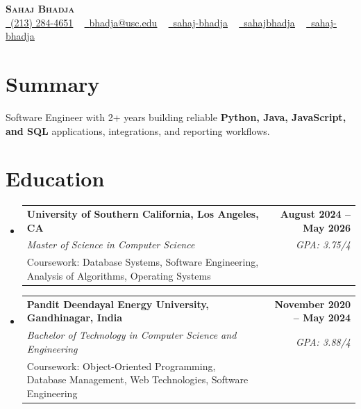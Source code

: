 \documentclass[letterpaper,10pt]{article}
\makeatletter
\newcommand{\sectionGap}{\vspace{-8pt}}
\newcommand{\resumeEduSubheading}[5]{\vspace{-1pt}\item\begin{tabular*}{1.0\textwidth}[t]{l@{\extracolsep{\fill}}r}\textbf{#1} & \textbf{\small #2} \\\textit{\small #3} & \textit{\small #4} \\\small #5 & \\\end{tabular*}\vspace{-4pt}}
\newcommand{\resumeSubHeadingListStart}{\begin{itemize}[leftmargin=0.0in, label={}]}
\newcommand{\resumeSubHeadingListEnd}{\end{itemize}}
\makeatother
\begin{document}
\begin{center}
{\Huge \scshape \textbf{Sahaj Bhadja}} \\ \vspace{1pt}
\small \href{tel:2132844651}{\faPhone\ \underline{(213) 284-4651}} ~ \href{mailto:bhadja@usc.edu}{\raisebox{-0.2\height}\faEnvelope\ \underline{bhadja@usc.edu}} ~
\href{https://www.linkedin.com/in/sahaj-bhadja/}{\raisebox{-0.2\height}\faLinkedin\ \underline{sahaj-bhadja}} ~ \href{https://github.com/SAHAJ-BHADJA}{\raisebox{-0.2\height}\faGithub\ \underline{sahajbhadja}} ~
\href{https://sahaj-bhadja.vercel.app/}{\raisebox{-0.2\height}\faGlobe\ \underline{sahaj-bhadja}}
\end{center}
\vspace{-16pt}
\section{Summary}
\begin{itemize}[leftmargin=0.15in, label={}]
\small{\item{Software Engineer with 2+ years building reliable \textbf{Python, Java, JavaScript, and SQL} applications, integrations, and reporting workflows.}}
\end{itemize}
\sectionGap
\section{Education}
\resumeSubHeadingListStart
\resumeEduSubheading{University of Southern California, Los Angeles, CA}{August 2024 -- May 2026}{Master of Science in Computer Science}{GPA: 3.75/4}{Coursework: Database Systems, Software Engineering, Analysis of Algorithms, Operating Systems}
\resumeEduSubheading{Pandit Deendayal Energy University, Gandhinagar, India}{November 2020 -- May 2024}{Bachelor of Technology in Computer Science and Engineering}{GPA: 3.88/4}{Coursework: Object-Oriented Programming, Database Management, Web Technologies, Software Engineering}
\resumeSubHeadingListEnd
\sectionGap
\end{document}
